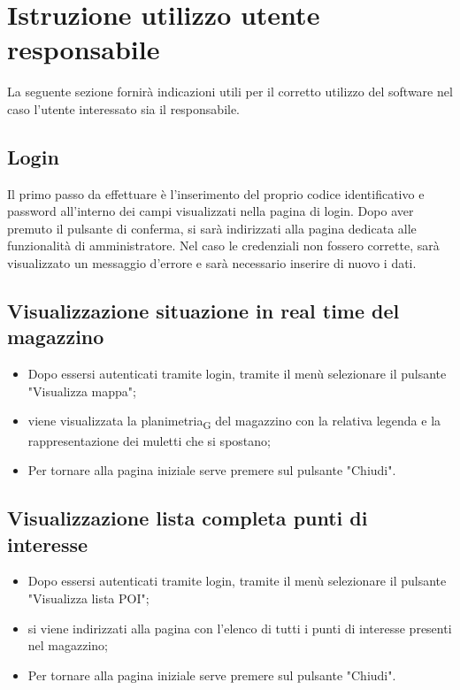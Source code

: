 \section{Istruzione utilizzo utente responsabile}

La seguente sezione fornirà indicazioni utili per il corretto utilizzo del software nel caso l'utente interessato sia il responsabile.

\subsection{Login}
Il primo passo da effettuare è l'inserimento del proprio codice identificativo e password all'interno dei campi visualizzati nella pagina di login. Dopo aver premuto il pulsante di conferma, si sarà indirizzati alla pagina dedicata alle funzionalità di amministratore. Nel caso le credenziali non fossero corrette, sarà visualizzato un messaggio d'errore e sarà necessario inserire di nuovo i dati.

\subsection{Visualizzazione situazione in real time del magazzino}
\begin{itemize}
    \item Dopo essersi autenticati tramite login, tramite il menù selezionare il pulsante "Visualizza mappa";
    \item viene visualizzata la planimetria\textsubscript{G} del magazzino con la relativa legenda e la rappresentazione dei muletti che si spostano;
    \item Per tornare alla pagina iniziale serve premere sul pulsante "Chiudi".
\end{itemize}
\subsection{Visualizzazione lista completa punti di interesse}
\begin{itemize}
    \item Dopo essersi autenticati tramite login, tramite il menù selezionare il pulsante "Visualizza lista POI";
    \item si viene indirizzati alla pagina con l'elenco di tutti i punti di interesse presenti nel magazzino;
    \item Per tornare alla pagina iniziale serve premere sul pulsante "Chiudi".
\end{itemize}
